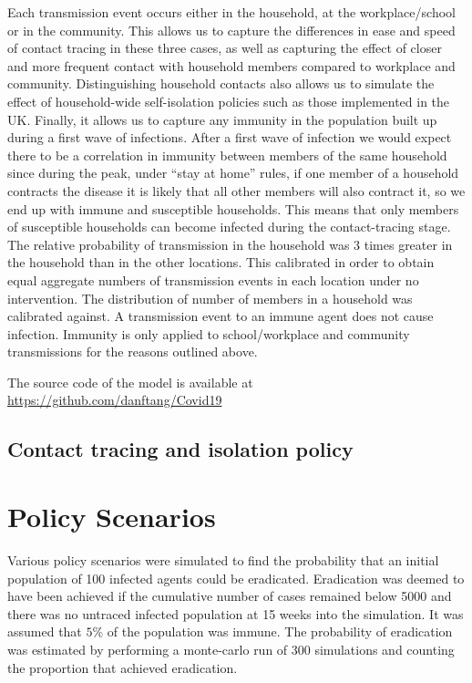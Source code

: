 \documentclass{article}
\begin{document}
Each transmission event occurs either in the household, at the workplace/school or in the community. This allows us to capture the differences in ease and speed of contact tracing in these three cases, as well as capturing the effect of closer and more frequent contact with household members compared to workplace and community. Distinguishing household contacts also allows us to simulate the effect of household-wide self-isolation policies such as those implemented in the UK. Finally, it allows us to capture any immunity in the population built up during a first wave of infections. After a first wave of infection we would expect there to be a correlation in immunity between members of the same household since during the peak, under ``stay at home'' rules, if one member of a household contracts the disease it is likely that all other members will also contract it, so we end up with immune and susceptible households. This means that only members of susceptible households can become infected during the contact-tracing stage. The relative probability of transmission in the household was 3 times greater in the household than in the other locations. This calibrated in order to obtain equal aggregate numbers of transmission events in each location under no intervention\cite{ferguson2020impact}. The distribution of number of members in a household was calibrated against\cite{smithHouseholds}. A transmission event to an immune agent does not cause infection. Immunity is only applied to school/workplace and community transmissions for the reasons outlined above.

The source code of the model is available at \href{https://github.com/danftang/Covid19}{https://github.com/danftang/Covid19}

\subsection{Contact tracing and isolation policy}

\section{Policy Scenarios}

Various policy scenarios were simulated to find the probability that an initial population of 100 infected agents could be eradicated. Eradication was deemed to have been achieved if the cumulative number of cases remained below 5000 and there was no untraced infected population at 15 weeks into the simulation. It was assumed that $5\%$ of the population was immune. The probability of eradication was estimated by performing a monte-carlo run of 300 simulations and counting the proportion that achieved eradication.
\end{document}
